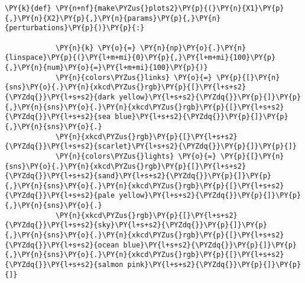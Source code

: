 \begin{Verbatim}[commandchars=\\\{\}]
        \PY{k}{def} \PY{n+nf}{make\PYZus{}plots2}\PY{p}{(}\PY{n}{X1}\PY{p}{,}\PY{n}{X2}\PY{p}{,}\PY{n}{params}\PY{p}{,}\PY{n}{perturbations}\PY{p}{)}\PY{p}{:}
            
            \PY{n}{k} \PY{o}{=} \PY{n}{np}\PY{o}{.}\PY{n}{linspace}\PY{p}{(}\PY{l+m+mi}{0}\PY{p}{,}\PY{l+m+mi}{100}\PY{p}{,}\PY{n}{num}\PY{o}{=}\PY{l+m+mi}{100}\PY{p}{)}
            \PY{n}{colors\PYZus{}links} \PY{o}{=} \PY{p}{[}\PY{n}{sns}\PY{o}{.}\PY{n}{xkcd\PYZus{}rgb}\PY{p}{[}\PY{l+s+s2}{\PYZdq{}}\PY{l+s+s2}{dark yellow}\PY{l+s+s2}{\PYZdq{}}\PY{p}{]}\PY{p}{,}\PY{n}{sns}\PY{o}{.}\PY{n}{xkcd\PYZus{}rgb}\PY{p}{[}\PY{l+s+s2}{\PYZdq{}}\PY{l+s+s2}{sea blue}\PY{l+s+s2}{\PYZdq{}}\PY{p}{]}\PY{p}{,}\PY{n}{sns}\PY{o}{.}
            \PY{n}{xkcd\PYZus{}rgb}\PY{p}{[}\PY{l+s+s2}{\PYZdq{}}\PY{l+s+s2}{scarlet}\PY{l+s+s2}{\PYZdq{}}\PY{p}{]}\PY{p}{]}
            \PY{n}{colors\PYZus{}lights} \PY{o}{=} \PY{p}{[}\PY{n}{sns}\PY{o}{.}\PY{n}{xkcd\PYZus{}rgb}\PY{p}{[}\PY{l+s+s2}{\PYZdq{}}\PY{l+s+s2}{sand}\PY{l+s+s2}{\PYZdq{}}\PY{p}{]}\PY{p}{,}\PY{n}{sns}\PY{o}{.}\PY{n}{xkcd\PYZus{}rgb}\PY{p}{[}\PY{l+s+s2}{\PYZdq{}}\PY{l+s+s2}{pale yellow}\PY{l+s+s2}{\PYZdq{}}\PY{p}{]}\PY{p}{,}\PY{n}{sns}\PY{o}{.}
            \PY{n}{xkcd\PYZus{}rgb}\PY{p}{[}\PY{l+s+s2}{\PYZdq{}}\PY{l+s+s2}{sky}\PY{l+s+s2}{\PYZdq{}}\PY{p}{]}\PY{p}{,}\PY{n}{sns}\PY{o}{.}\PY{n}{xkcd\PYZus{}rgb}\PY{p}{[}\PY{l+s+s2}{\PYZdq{}}\PY{l+s+s2}{ocean blue}\PY{l+s+s2}{\PYZdq{}}\PY{p}{]}\PY{p}{,}\PY{n}{sns}\PY{o}{.}\PY{n}{xkcd\PYZus{}rgb}\PY{p}{[}\PY{l+s+s2}{\PYZdq{}}\PY{l+s+s2}{salmon pink}\PY{l+s+s2}{\PYZdq{}}\PY{p}{]}\PY{p}{]}
            

\end{Verbatim}
